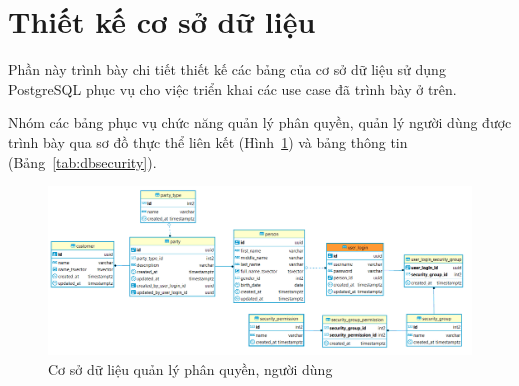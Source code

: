 


\section{Thiết kế cơ sở dữ liệu}
Phần này trình bày chi tiết thiết kế các bảng của cơ sở dữ
liệu sử dụng PostgreSQL phục vụ cho việc triển khai các use case
đã trình bày ở trên.

Nhóm các bảng phục vụ chức năng quản lý phân quyền, quản lý
người dùng được trình bày qua sơ đồ thực thể liên kết
(Hình~\ref{fig:dbsecurity}) và bảng thông tin (Bảng~\ref{tab:dbsecurity}).

\begin{figure}[H]
\centering
\includegraphics[width=17cm]{images/database/security.png}
\caption{Cơ sở dữ liệu quản lý phân quyền, người dùng}
\label{fig:dbsecurity}
\end{figure}

